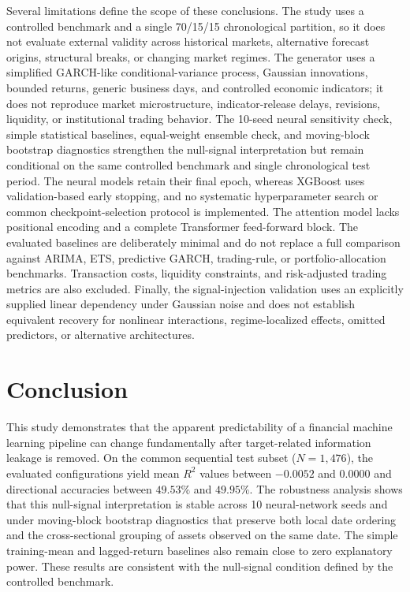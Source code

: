 \documentclass[utf8]{FrontiersinHarvard} %
\newcommand{\rev}[1]{{\color{red}#1}}
\begin{document}
Several limitations define the scope of these conclusions. The study uses a controlled benchmark and a single 70/15/15 chronological partition, so it does not evaluate external validity across historical markets, alternative forecast origins, structural breaks, or changing market regimes. The generator uses a simplified GARCH-like conditional-variance process, Gaussian innovations, bounded returns, generic business days, and controlled economic indicators; it does not reproduce market microstructure, indicator-release delays, revisions, liquidity, or institutional trading behavior. \rev{The 10-seed neural sensitivity check, simple statistical baselines, equal-weight ensemble check, and moving-block bootstrap diagnostics strengthen the null-signal interpretation but remain conditional on the same controlled benchmark and single chronological test period.} The neural models retain their final epoch, whereas XGBoost uses validation-based early stopping, and no systematic hyperparameter search or common checkpoint-selection protocol is implemented. The attention model lacks positional encoding and a complete Transformer feed-forward block. \rev{The evaluated baselines are deliberately minimal and do not replace a full comparison against ARIMA, ETS, predictive GARCH, trading-rule, or portfolio-allocation benchmarks.} Transaction costs, liquidity constraints, and risk-adjusted trading metrics are also excluded. Finally, the signal-injection validation uses an explicitly supplied linear dependency under Gaussian noise and does not establish equivalent recovery for nonlinear interactions, regime-localized effects, omitted predictors, or alternative architectures.

\section{Conclusion}
\label{sec:conclusion}

This study demonstrates that the apparent predictability of a financial machine learning pipeline can change fundamentally after target-related information leakage is removed. On the common sequential test subset (\(N=1{,}476\)), the evaluated configurations yield mean \(R^2\) values between \(-0.0052\) and \(0.0000\) and directional accuracies between \(49.53\%\) and \(49.95\%\). \rev{The robustness analysis shows that this null-signal interpretation is stable across 10 neural-network seeds and under moving-block bootstrap diagnostics that preserve both local date ordering and the cross-sectional grouping of assets observed on the same date. The simple training-mean and lagged-return baselines also remain close to zero explanatory power.} These results are consistent with the null-signal condition defined by the controlled benchmark.
\end{document}
